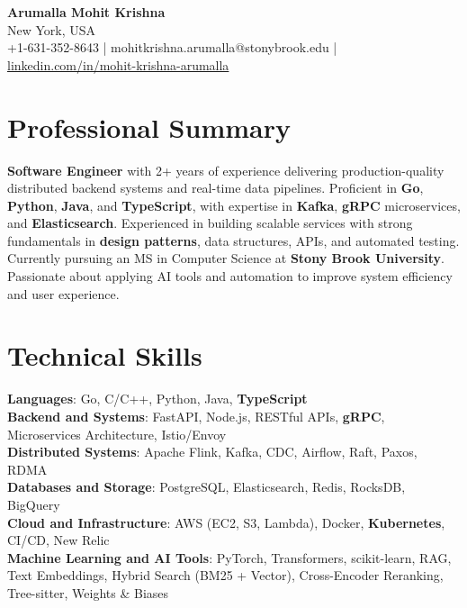 \documentclass[letterpaper,11pt]{article}
\begin{document}
\begin{center}
  {\Large \textbf{Arumalla Mohit Krishna}} \\
  New York, USA \\
  +1-631-352-8643 \enspace | \enspace mohitkrishna.arumalla@stonybrook.edu \enspace | \enspace \href{https://www.linkedin.com/in/mohit-krishna-arumalla}{linkedin.com/in/mohit-krishna-arumalla}
\end{center}

\section{Professional Summary}
  \begin{itemize}[leftmargin=0.15in, label={}]
    \small{\item{
     \textbf{Software Engineer} with 2+ years of experience delivering production-quality distributed backend systems and real-time data pipelines. Proficient in \textbf{Go}, \textbf{Python}, \textbf{Java}, and \textbf{TypeScript}, with expertise in \textbf{Kafka}, \textbf{gRPC} microservices, and \textbf{Elasticsearch}. Experienced in building scalable services with strong fundamentals in \textbf{design patterns}, data structures, APIs, and automated testing. Currently pursuing an MS in Computer Science at \textbf{Stony Brook University}. Passionate about applying AI tools and automation to improve system efficiency and user experience.
    }}
  \end{itemize}
\vspace{-16pt}

\section{Technical Skills}
 \begin{itemize}[leftmargin=0.15in, label={}]
    \small{\item{
     \textbf{Languages}: Go, C/C++, Python, Java, \textbf{TypeScript} \\
     \textbf{Backend and Systems}: FastAPI, Node.js, RESTful APIs, \textbf{gRPC}, Microservices Architecture, Istio/Envoy \\
     \textbf{Distributed Systems}: Apache Flink, Kafka, CDC, Airflow, Raft, Paxos, RDMA \\
     \textbf{Databases and Storage}: PostgreSQL, Elasticsearch, Redis, RocksDB, BigQuery \\
     \textbf{Cloud and Infrastructure}: AWS (EC2, S3, Lambda), Docker, \textbf{Kubernetes}, CI/CD, New Relic \\
     \textbf{Machine Learning and AI Tools}: PyTorch, Transformers, scikit-learn, RAG, Text Embeddings, Hybrid Search (BM25 + Vector), Cross-Encoder Reranking, Tree-sitter, Weights \& Biases
    }}
 \end{itemize}
\vspace{-16pt}
\end{document}
